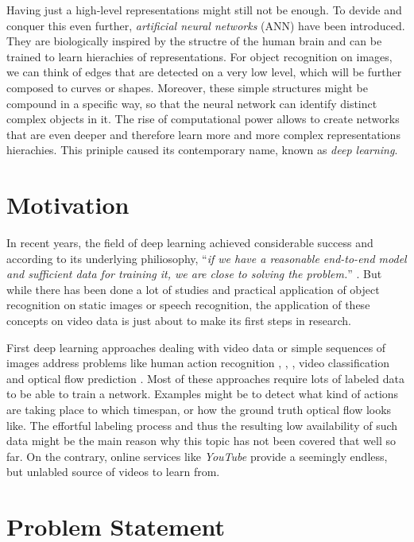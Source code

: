 Having just a high-level representations might still not be enough. To devide and conquer this even further, \textit{artificial neural networks} (ANN) have been introduced. They are biologically inspired by the structre of the human brain \parencite{ann} and can be trained to learn hierachies of representations. For object recognition on images, we can think of edges that are detected on a very low level, which will be further composed to curves or shapes. Moreover, these simple structures might be compound in a specific way, so that the neural network can identify distinct complex objects in it. The rise of computational power allows to create networks that are even deeper and therefore learn more and more complex representations hierachies. This priniple caused its contemporary name, known as \textit{deep learning}.

\section{Motivation}

In recent years, the field of deep learning achieved considerable success and according to its underlying philiosophy, ``\textit{if we have a reasonable end-to-end model and sufficient data for training it, we are close to solving the problem.}'' \parencite{conv_lstm_nowcasting}. But while there has been done a lot of studies and practical application of object recognition on static images or speech recognition, the application of these concepts on video data is just about to make its first steps in research. 

First deep learning approaches dealing with video data or simple sequences of images address problems like human action recognition \parencite{conv3d_action_class}, \parencite{two_stream_action}, \parencite{longterm_rec_recog}, video classification \parencite{large_video_class} and optical flow prediction \parencite{flownet}. Most of these approaches require lots of labeled data to be able to train a network. Examples might be to detect what kind of actions are taking place to which timespan, or how the ground truth optical flow looks like. The effortful labeling process and thus the resulting low availability of such data might be the main reason why this topic has not been covered that well so far. On the contrary, online services like \textit{YouTube} provide a seemingly endless, but unlabled source of videos to learn from.


\section{Problem Statement}

